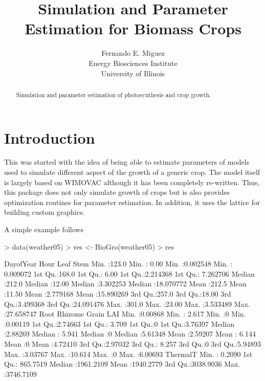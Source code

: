 \documentclass[12pt]{article}
\title{Simulation and Parameter Estimation for Biomass Crops}
\author{Fernando E. Miguez\\Energy Biosciences Institute\\
  University of Illinois}
\begin{document}
\newcommand{\code}[1]{\texttt{\small{#1}}}
\newcommand{\package}[1]{\textsf{\small{#1}}}
\maketitle
\begin{abstract}
Simulation and parameter estimation of photosynthesis and crop growth.
\end{abstract}


\section{Introduction}

This was started with the idea of being able to estimate parameters of
models used to simulate different aspect of the growth of a generic
crop. The model itself is largely based on WIMOVAC although it has
been completely re-written. Thus, this package does not only simulate
growth of crops but is also provides optimization routines for
parameter estimation. In addition, it uses the \package{lattice} for
building custom graphics.

A simple example follows

\begin{Schunk}
\begin{Sinput}
> data(weather05)
> res <- BioGro(weather05)
> res
\end{Sinput}
\begin{Soutput}
   DayofYear          Hour            Leaf               Stem          
 Min.   :123.0   Min.   : 0.00   Min.   :0.002548   Min.   : 0.009072  
 1st Qu.:168.0   1st Qu.: 6.00   1st Qu.:2.214368   1st Qu.: 7.262706  
 Median :212.0   Median :12.00   Median :3.302253   Median :18.070772  
 Mean   :212.5   Mean   :11.50   Mean   :2.779168   Mean   :15.890269  
 3rd Qu.:257.0   3rd Qu.:18.00   3rd Qu.:3.499368   3rd Qu.:24.091476  
 Max.   :301.0   Max.   :23.00   Max.   :3.533489   Max.   :27.658747  
      Root            Rhizome           Grain        LAI         
 Min.   :0.00868   Min.   : 2.617   Min.   :0   Min.   :0.00119  
 1st Qu.:2.74663   1st Qu.: 3.709   1st Qu.:0   1st Qu.:3.76397  
 Median :2.88269   Median : 5.941   Median :0   Median :5.61348  
 Mean   :2.59207   Mean   : 6.144   Mean   :0   Mean   :4.72410  
 3rd Qu.:2.97032   3rd Qu.: 8.257   3rd Qu.:0   3rd Qu.:5.94893  
 Max.   :3.03767   Max.   :10.614   Max.   :0   Max.   :6.00693  
    ThermalT        
 Min.   :   0.2090  
 1st Qu.: 865.7519  
 Median :1961.2109  
 Mean   :1940.2779  
 3rd Qu.:3038.9036  
 Max.   :3746.7109  
\end{Soutput}
\end{Schunk}
\end{document}
